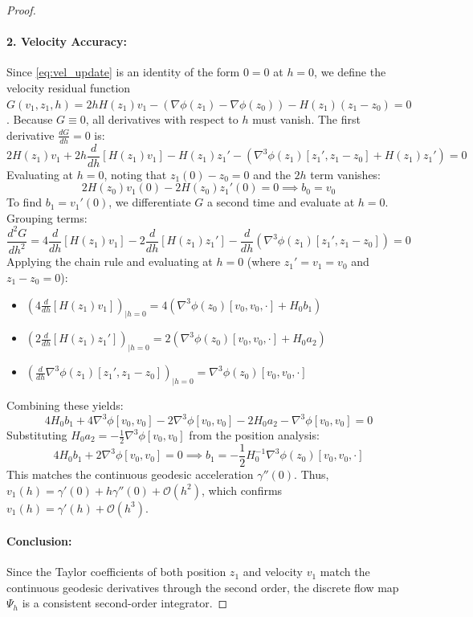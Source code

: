 \documentclass[11pt,a4paper]{article}
\begin{document}
\begin{proof}
\paragraph{2. Velocity Accuracy:}
Since \eqref{eq:vel_update} is an identity of the form $0=0$ at $h=0$, we define the velocity residual function $G(v_1, z_1, h) = 2h H(z_1)v_1 - (\nabla \phi(z_1) - \nabla \phi(z_0)) - H(z_1)(z_1 - z_0) = 0$. Because $G \equiv 0$, all derivatives with respect to $h$ must vanish. The first derivative $\frac{dG}{dh} = 0$ is:
\begin{equation}
    2H(z_1)v_1 + 2h\frac{d}{dh}[H(z_1)v_1] - H(z_1)z_1' - \left( \nabla^3 \phi(z_1)[z_1', z_1 - z_0] + H(z_1)z_1' \right) = 0
\end{equation}
Evaluating at $h=0$, noting that $z_1(0) - z_0 = 0$ and the $2h$ term vanishes:
\begin{equation}
    2H(z_0)v_1(0) - 2H(z_0)z_1'(0) = 0 \implies b_0 = v_0
\end{equation}
To find $b_1 = v_1'(0)$, we differentiate $G$ a second time and evaluate at $h=0$. Grouping terms:
\begin{equation}
    \frac{d^2G}{dh^2} = 4\frac{d}{dh}[H(z_1)v_1] - 2\frac{d}{dh}[H(z_1)z_1'] - \frac{d}{dh}\left( \nabla^3 \phi(z_1)[z_1', z_1 - z_0] \right) = 0
\end{equation}
Applying the chain rule and evaluating at $h=0$ (where $z_1' = v_1 = v_0$ and $z_1 - z_0 = 0$):
\begin{itemize}
    \item $\left( 4\frac{d}{dh}[H(z_1)v_1] \right)_{|h=0} = 4(\nabla^3 \phi(z_0)[v_0, v_0, \cdot] + H_0 b_1)$
    \item $\left( 2\frac{d}{dh}[H(z_1)z_1'] \right)_{|h=0} = 2(\nabla^3 \phi(z_0)[v_0, v_0, \cdot] + H_0 a_2)$
    \item $\left( \frac{d}{dh} \nabla^3 \phi(z_1)[z_1', z_1 - z_0] \right)_{|h=0} = \nabla^3 \phi(z_0)[v_0, v_0, \cdot]$
\end{itemize}



Combining these yields:
\begin{equation}
    4H_0 b_1 + 4\nabla^3 \phi[v_0, v_0] - 2\nabla^3 \phi[v_0, v_0] - 2H_0 a_2 - \nabla^3 \phi[v_0, v_0] = 0
\end{equation}
Substituting $H_0 a_2 = -\frac{1}{2}\nabla^3 \phi[v_0, v_0]$ from the position analysis:
\begin{equation}
    4H_0 b_1 + 2\nabla^3 \phi[v_0, v_0] = 0 \implies b_1 = -\frac{1}{2}H_0^{-1}\nabla^3 \phi(z_0)[v_0, v_0, \cdot]
\end{equation}
This matches the continuous geodesic acceleration $\gamma''(0)$. Thus, $v_1(h) = \gamma'(0) + h \gamma''(0) + \mathcal{O}(h^2)$, which confirms $v_1(h) = \gamma'(h) + \mathcal{O}(h^3)$.
\paragraph{Conclusion:}
Since the Taylor coefficients of both position $z_1$ and velocity $v_1$ match the continuous geodesic derivatives through the second order, the discrete flow map $\Psi_h$ is a consistent second-order integrator.
\end{proof}
\end{document}
